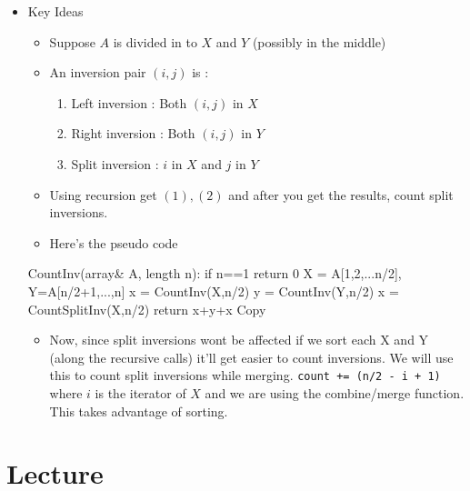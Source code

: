 \documentclass[a4paper
]{article}
\newenvironment{Shaded}{}{}
\newcommand{\NormalTok}[1]{#1}
\providecommand{\tightlist}{%
  \setlength{\itemsep}{0pt}\setlength{\parskip}{0pt}}
\begin{document}
\begin{itemize}
\item
  Key Ideas

  \begin{itemize}
  \tightlist
  \item
    Suppose {\(A\)} is divided in to {\(X\)} and {\(Y\)} (possibly in
    the middle)
  \item
    An inversion pair {\((i,j)\)} is :

    \begin{enumerate}
    \tightlist
    \item
      Left inversion : Both {\((i,j)\)} in {\(X\)}
    \item
      Right inversion : Both {\((i,j)\)} in {\(Y\)}
    \item
      Split inversion : {\(i\)} in {\(X\)} and {\(j\)} in {\(Y\)}
    \end{enumerate}
  \item
    Using recursion get {\((1),(2)\)} and after you get the results,
    count split inversions.
  \item
    Here's the pseudo code
  \end{itemize}

\begin{Shaded}
\begin{Highlighting}[]
\NormalTok{CountInv(array\& A, length n):}
\NormalTok{    if n==1 return 0}
\NormalTok{    X = A[1,2,...n/2], Y=A[n/2+1,...,n]}
\NormalTok{    x = CountInv(X,n/2)}
\NormalTok{    y = CountInv(Y,n/2)}
\NormalTok{    x = CountSplitInv(X,n/2)}
\NormalTok{    return x+y+x}
\NormalTok{Copy}
\end{Highlighting}
\end{Shaded}

  \begin{itemize}
  \tightlist
  \item
    Now, since split inversions wont be affected if we sort each X and Y
    (along the recursive calls) it'll get easier to count inversions. We
    will use this to count split inversions while merging.
    \texttt{count\ +=\ (n/2\ -\ i\ +\ 1)} where {\(i\)} is the iterator
    of {\(X\)} and we are using the combine/merge function. This takes
    advantage of sorting.
  \end{itemize}
\end{itemize}

\hypertarget{lecture-4}{%
\section{Lecture}\label{lecture-4}}
\end{document}

